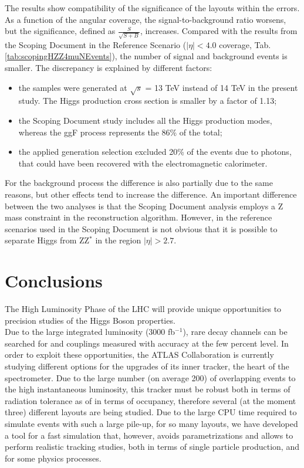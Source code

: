 \documentclass[a4paper,twoside,12pt]{book}
\begin{document}
The results show compatibility of the significance of the layouts within the errors. As a function of the angular coverage, the 
signal-to-background ratio worsens, but the significance, defined as $\frac{S}{\sqrt{S+B}}$, increases. 
Compared with the results from the Scoping Document in the Reference Scenario 
($|\eta| < 4.0$ coverage, Tab.\ref{tab:scopingHZZ4muNEvents}), the number of
signal and background events is smaller. The discrepancy is explained by 
different factors:\\
\begin{itemize}
\item the samples were generated at $\sqrt{s}$ = 13 TeV instead of 14 TeV in the present study. The Higgs
production cross section is smaller by a factor of 1.13; 
\item the Scoping Document study includes all the Higgs production modes, whereas the ggF process represents the 86\% of 
the total;
\item the applied generation selection excluded 20\% of the events due to photons, that could have been recovered with
	the electromagnetic calorimeter.
\end{itemize} 

For the background process the difference is also partially due to the same reasons, but other effects tend to increase the difference. 
An important difference between the two analyses is that the Scoping Document analysis employs a Z mass constraint
in the reconstruction algorithm. However, in the reference scenarios used in the Scoping Document is not obvious that it is possible to separate Higgs from ZZ$^{*}$ in the region $|\eta| > 2.7$.

\clearpage
\chapter{Conclusions}\label{sec:conclusions}

The High Luminosity Phase of the LHC will provide unique opportunities to precision studies of the Higgs Boson properties. \\

Due to the large integrated luminosity (3000 fb$^{-1}$), rare decay channels can be searched for and couplings measured with accuracy at the few percent level.
In order to exploit these opportunities, the ATLAS Collaboration is currently studying different options for the upgrades of its inner tracker, the heart of the spectrometer. Due to the large number (on average 200) of overlapping events to the high instantaneous luminosity, this tracker must be robust both in terms of radiation tolerance as of in terms of occupancy, therefore several (at the moment three) different layouts are being studied. Due to the large CPU time required to simulate events with such a large pile-up, for so many layouts, we have developed a tool for a fast simulation that, however, avoids parametrizations and allows to perform realistic tracking studies, both in terms of single particle production, and for some physics processes.\\
\end{document}
